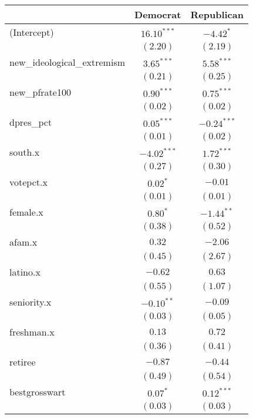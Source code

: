 \documentclass[12pt]{article}
\begin{document}
\begin{table}
	\begin{center}
		\begin{tabular}{l c c }
			\hline
			& Democrat & Republican \\
			\hline
			(Intercept)                 & $16.10^{***}$ & $-4.42^{*}$   \\
			& $(2.20)$      & $(2.19)$      \\
			new\_ideological\_extremism & $3.65^{***}$  & $5.58^{***}$  \\
			& $(0.21)$      & $(0.25)$      \\
			new\_pfrate100              & $0.90^{***}$  & $0.75^{***}$  \\
			& $(0.02)$      & $(0.02)$      \\
			dpres\_pct                  & $0.05^{***}$  & $-0.24^{***}$ \\
			& $(0.01)$      & $(0.02)$      \\
			south.x                     & $-4.02^{***}$ & $1.72^{***}$  \\
			& $(0.27)$      & $(0.30)$      \\
			votepct.x                   & $0.02^{*}$    & $-0.01$       \\
			& $(0.01)$      & $(0.01)$      \\
			female.x                    & $0.80^{*}$    & $-1.44^{**}$  \\
			& $(0.38)$      & $(0.52)$      \\
			afam.x                      & $0.32$        & $-2.06$       \\
			& $(0.45)$      & $(2.67)$      \\
			latino.x                    & $-0.62$       & $0.63$        \\
			& $(0.55)$      & $(1.07)$      \\
			seniority.x                 & $-0.10^{**}$  & $-0.09$       \\
			& $(0.03)$      & $(0.05)$      \\
			freshman.x                  & $0.13$        & $0.72$        \\
			& $(0.36)$      & $(0.41)$      \\
			retiree                     & $-0.87$       & $-0.44$       \\
			& $(0.49)$      & $(0.54)$      \\
			bestgrosswart               & $0.07^{*}$    & $0.12^{***}$  \\
			& $(0.03)$      & $(0.03)$      \\

\end{tabular}
\end{center}
\end{table}
\end{document}
